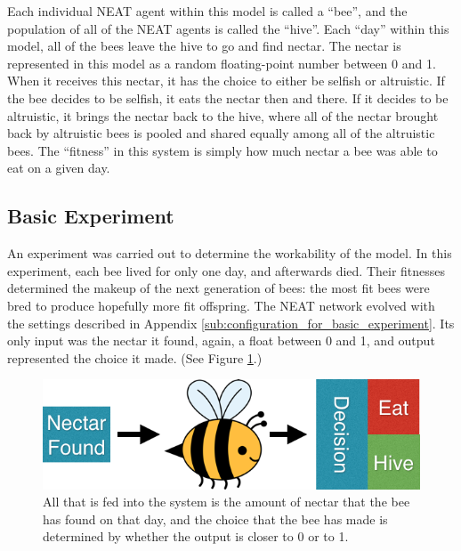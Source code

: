 \documentclass[11pt]{article}
\begin{document}
			Each individual NEAT agent within this model is called a ``bee'', and the population of all of the NEAT agents is called the ``hive''. Each ``day'' within this model, all of the bees leave the hive to go and find nectar. The nectar is represented in this model as a random floating-point number between 0 and 1. When it receives this nectar, it has the choice to either be selfish or altruistic. If the bee decides to be selfish, it eats the nectar then and there. If it decides to be altruistic, it brings the nectar back to the hive, where all of the nectar brought back by altruistic bees is pooled and shared equally among all of the altruistic bees. The ``fitness'' in this system is simply how much nectar a bee was able to eat on a given day.

		\subsection{Basic Experiment} %
		\label{sub:basic_experiment}
			An experiment was carried out to determine the workability of the model. In this experiment, each bee lived for only one day, and afterwards died. Their fitnesses determined the makeup of the next generation of bees: the most fit bees were bred to produce hopefully more fit offspring. The NEAT network evolved with the settings described in Appendix \ref{sub:configuration_for_basic_experiment}. Its only input was the nectar it found, again, a float between 0 and 1, and output represented the choice it made. (See Figure \ref{fig:naive_system}.)

			\begin{figure}[tb]
				\begin{center}
					\includegraphics[scale=.5]{bee_diagrams/naive_system.png}
				\end{center}
				\caption{All that is fed into the system is the amount of nectar that the bee has found on that day, and the choice that the bee has made is determined by whether the output is closer to 0 or to 1.}
				\label{fig:naive_system}
			\end{figure}
\end{document}
